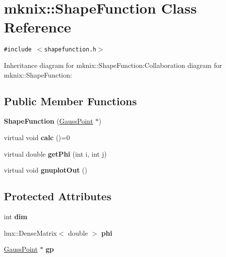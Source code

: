 \hypertarget{classmknix_1_1ShapeFunction}{
\section{mknix::ShapeFunction Class Reference}
\label{classmknix_1_1ShapeFunction}
}
{\tt \#include $<$shapefunction.h$>$}

Inheritance diagram for mknix::ShapeFunction:Collaboration diagram for mknix::ShapeFunction:\subsection*{Public Member Functions}
\begin{CompactItemize}
\item 
\hypertarget{classmknix_1_1ShapeFunction_191b6e9da6f56261e2467fde0a473ac6}{
\textbf{ShapeFunction} (\hyperlink{classmknix_1_1GaussPoint}{GaussPoint} $\ast$)}
\label{classmknix_1_1ShapeFunction_191b6e9da6f56261e2467fde0a473ac6}

\item 
\hypertarget{classmknix_1_1ShapeFunction_c4a0d1b43ff7d4adf788e677912a87f7}{
virtual void \textbf{calc} ()=0}
\label{classmknix_1_1ShapeFunction_c4a0d1b43ff7d4adf788e677912a87f7}

\item 
\hypertarget{classmknix_1_1ShapeFunction_13f35e2b1cfc89c26ee03ede4bfff586}{
virtual double \textbf{getPhi} (int i, int j)}
\label{classmknix_1_1ShapeFunction_13f35e2b1cfc89c26ee03ede4bfff586}

\item 
\hypertarget{classmknix_1_1ShapeFunction_6b287c3758e7d16be4c7c8e86bbb7077}{
virtual void \textbf{gnuplotOut} ()}
\label{classmknix_1_1ShapeFunction_6b287c3758e7d16be4c7c8e86bbb7077}

\end{CompactItemize}
\subsection*{Protected Attributes}
\begin{CompactItemize}
\item 
\hypertarget{classmknix_1_1ShapeFunction_1ca9a4d7bc5f82c887ac7e9bdd54aa1e}{
int \textbf{dim}}
\label{classmknix_1_1ShapeFunction_1ca9a4d7bc5f82c887ac7e9bdd54aa1e}

\item 
\hypertarget{classmknix_1_1ShapeFunction_c1eaf8c2e5d8d6abf4726eb416de13d9}{
lmx::DenseMatrix$<$ double $>$ \textbf{phi}}
\label{classmknix_1_1ShapeFunction_c1eaf8c2e5d8d6abf4726eb416de13d9}

\item 
\hypertarget{classmknix_1_1ShapeFunction_3f0195dcea758355e53f8f0a499762d5}{
\hyperlink{classmknix_1_1GaussPoint}{GaussPoint} $\ast$ \textbf{gp}}
\label{classmknix_1_1ShapeFunction_3f0195dcea758355e53f8f0a499762d5}

\end{CompactItemize}


